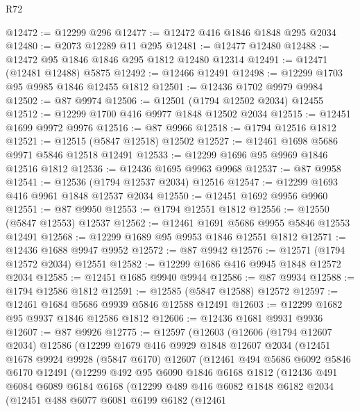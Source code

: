 \begin{lexlean}{R72}
\begin{coremodule}
@12472 := @12299 @296
@12477 := @12472 @416 @1846 @1848 @295 @2034
@12480 := @2073 @12289 @11 @295
@12481 := @12477 @12480
@12488 := @12472 @95 @1846 @1846 @295 @1812 @12480 @12314
@12491 := @12471 (@12481 @12488) @5875
@12492 := @12466 @12491
@12498 := @12299 @1703 @95 @9985 @1846 @12455 @1812
@12501 := @12436 @1702 @9979 @9984
@12502 := @87 @9974
@12506 := @12501 (@1794 @12502 @2034) @12455
@12512 := @12299 @1700 @416 @9977 @1848 @12502 @2034
@12515 := @12451 @1699 @9972 @9976
@12516 := @87 @9966
@12518 := @1794 @12516 @1812
@12521 := @12515 (@5847 @12518) @12502
@12527 := @12461 @1698 @5686 @9971 @5846 @12518 @12491
@12533 := @12299 @1696 @95 @9969 @1846 @12516 @1812
@12536 := @12436 @1695 @9963 @9968
@12537 := @87 @9958
@12541 := @12536 (@1794 @12537 @2034) @12516
@12547 := @12299 @1693 @416 @9961 @1848 @12537 @2034
@12550 := @12451 @1692 @9956 @9960
@12551 := @87 @9950
@12553 := @1794 @12551 @1812
@12556 := @12550 (@5847 @12553) @12537
@12562 := @12461 @1691 @5686 @9955 @5846 @12553 @12491
@12568 := @12299 @1689 @95 @9953 @1846 @12551 @1812
@12571 := @12436 @1688 @9947 @9952
@12572 := @87 @9942
@12576 := @12571 (@1794 @12572 @2034) @12551
@12582 := @12299 @1686 @416 @9945 @1848 @12572 @2034
@12585 := @12451 @1685 @9940 @9944
@12586 := @87 @9934
@12588 := @1794 @12586 @1812
@12591 := @12585 (@5847 @12588) @12572
@12597 := @12461 @1684 @5686 @9939 @5846 @12588 @12491
@12603 := @12299 @1682 @95 @9937 @1846 @12586 @1812
@12606 := @12436 @1681 @9931 @9936
@12607 := @87 @9926
@12775 := @12597
    (@12603
      (@12606
        (@1794 @12607 @2034)
        @12586
        (@12299
          @1679
          @416
          @9929
          @1848
          @12607
          @2034
          (@12451
            @1678
            @9924
            @9928
            (@5847 @6170)
            @12607
            (@12461
              @494
              @5686
              @6092
              @5846
              @6170
              @12491
              (@12299
                @492
                @95
                @6090
                @1846
                @6168
                @1812
                (@12436
                  @491
                  @6084
                  @6089
                  @6184
                  @6168
                  (@12299
                    @489
                    @416
                    @6082
                    @1848
                    @6182
                    @2034
                    (@12451
                      @488
                      @6077
                      @6081
                      @6199
                      @6182
                      (@12461

\end{coremodule}
\end{lexlean}
